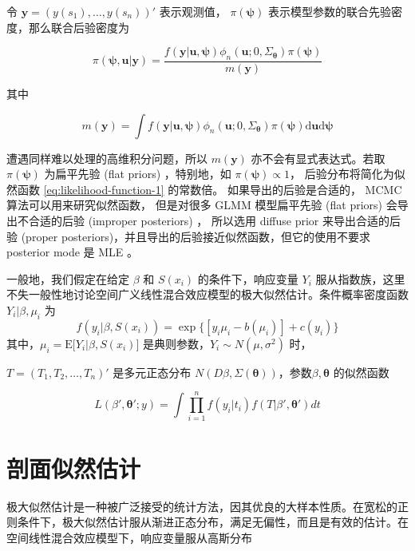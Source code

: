 \documentclass[12pt,a4paper,UTF8,twoside]{book}
\theoremstyle{definition}
\theoremstyle{definition}
\theoremstyle{definition}
\theoremstyle{remark}
\begin{document}
令 \(\mathbf{y} = (y(s_1),\ldots,y(s_n))'\) 表示观测值，
\(\pi(\boldsymbol{\psi})\)
表示模型参数的联合先验密度，那么联合后验密度为

\[
\pi(\boldsymbol{\psi},\mathbf{u}|\mathbf{y}) = \frac{f(\mathbf{y|\mathbf{u}, \boldsymbol{\psi}})\phi_{n}(\mathbf{u};0,\Sigma_{\boldsymbol{\theta}})\pi(\boldsymbol{\psi})}{m(\mathbf{y})}
\]

\noindent 其中

\[
m(\mathbf{y}) = \int f(\mathbf{y|\mathbf{u}, \boldsymbol{\psi}})\phi_{n}(\mathbf{u};0,\Sigma_{\boldsymbol{\theta}})\pi(\boldsymbol{\psi})\mathrm{d} \mathbf{u} \mathrm{d} \boldsymbol{\psi}
\]

\noindent 遭遇同样难以处理的高维积分问题，所以 \(m(\mathbf{y})\)
亦不会有显式表达式。若取 \(\pi(\boldsymbol{\psi})\) 为扁平先验 (flat
priors) ，特别地，如 \(\pi(\boldsymbol{\psi}) \propto 1\)，
后验分布将简化为似然函数 \eqref{eq:likelihood-function-1} 的常数倍。
如果导出的后验是合适的， MCMC 算法可以用来研究似然函数， 但是对很多 GLMM
模型扁平先验 (flat priors) 会导出不合适的后验 (improper posteriors)
\citep{Natarajan1995}， 所以选用 diffuse prior 来导出合适的后验 (proper
posteriors)，并且导出的后验接近似然函数，但它的使用不要求 posterior mode
是 MLE \citep{Robert1996JASA}。

一般地，我们假定在给定 \(\beta\) 和 \(S(x_i)\) 的条件下，响应变量
\(Y_i\)
服从指数族，这里不失一般性地讨论空间广义线性混合效应模型的极大似然估计。条件概率密度函数
\(Y_i|\beta,\mu_i\) 为
\[f(y_i|\beta,S(x_i))=\exp\{ [y_{i}\mu_i-b(\mu_i)] + c(y_i) \}\]
其中，\(\mu_i = \mathrm{E}\big[Y_i|\beta,S(x_i)\big]\)
是典则参数，\(Y_i \sim N(\mu,\sigma^2)\) 时，

\(T = (T_1,T_2,\ldots,T_n)'\) 是多元正态分布
\(N(D\beta,\Sigma(\boldsymbol{\theta}))\)，参数\(\beta,\boldsymbol{\theta}\)
的似然函数

\begin{equation}
L(\beta',\boldsymbol{\theta}';y) = \int \prod_{i=1}^{n}f(y_i|t_i)f(T|\beta',\boldsymbol{\theta}')dt \label{eq:likelihood-function}
\end{equation}

\hypertarget{profile-likelihood}{%
\section{剖面似然估计}\label{profile-likelihood}}

极大似然估计是一种被广泛接受的统计方法，因其优良的大样本性质。在宽松的正则条件下，极大似然估计服从渐进正态分布，满足无偏性，而且是有效的估计。在空间线性混合效应模型下，响应变量服从高斯分布
\end{document}
